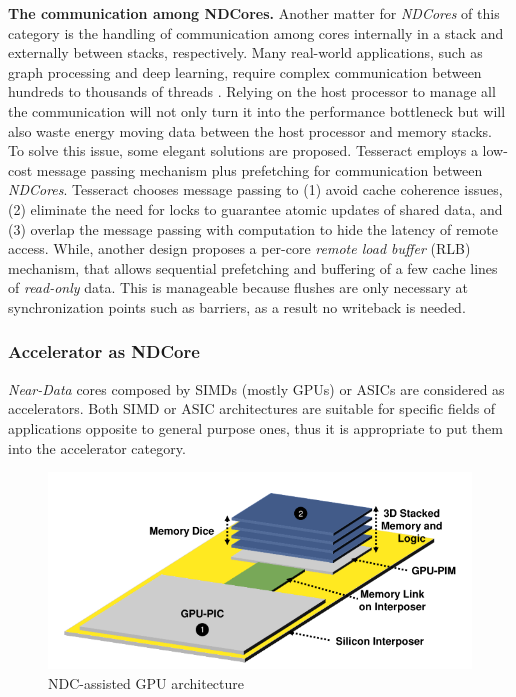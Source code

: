 \documentclass[letterpaper, 11pt, conference, margin=1in]{ieeeconf}   %
\begin{document}
\textbf{The communication among NDCores.} Another matter for \textit{NDCores} of this category is the handling of communication among cores internally in a stack and externally between stacks, respectively. Many real-world applications, such as graph processing and deep learning, require complex communication between hundreds to thousands of threads \cite{Gonzalez:2012:PDG:2387880.2387883, Chilimbi:2014:PAB:2685048.2685094}. Relying on the host processor to manage all the communication will not only turn it into the performance bottleneck but will also waste energy moving data between the host processor and memory stacks.\\
To solve this issue, some elegant solutions are proposed. Tesseract \cite{Ahn:2015:SPA:2749469.2750386} employs a low-cost message passing mechanism plus prefetching for communication between \textit{NDCores}. Tesseract chooses message passing to (1) avoid cache coherence issues, (2) eliminate the need for locks to guarantee atomic updates of shared data, and (3) overlap the message passing with computation to hide the latency of remote access. While, another design \cite{Gao2015} proposes a per-core \textit{remote load buffer} (RLB) mechanism, that allows sequential prefetching and buffering of a few cache lines of \textit{read-only} data. This is manageable because flushes are only necessary at synchronization points such as barriers, as a result no writeback is needed.

\subsubsection{\bf Accelerator as NDCore}
\textit{Near-Data} cores composed by SIMDs (mostly GPUs) or ASICs are considered as accelerators. Both SIMD or ASIC architectures are suitable for specific fields of applications opposite to general purpose ones, thus it is appropriate to put them into the accelerator category.

\begin{figure}[h]
  \center
  \includegraphics[scale=0.40]{figures/ndc_gpu.png}
  \caption{NDC-assisted GPU architecture \cite{7756764}}
  \label{fig:NDC-gpu}
\end{figure}
\end{document}
